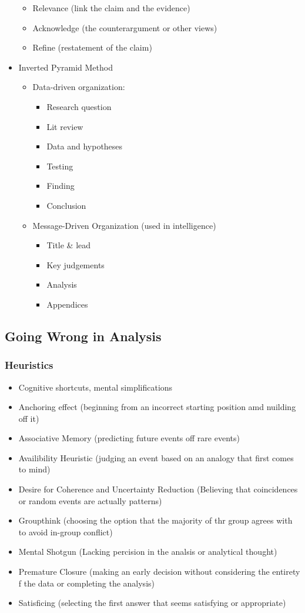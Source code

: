 \documentclass[11pt]{article}
\begin{document}
\begin{itemize}
\begin{itemize}
\item Relevance (link the claim and the evidence)
\item Acknowledge (the counterargument or other views)
\item Refine (restatement of the claim)
\end{itemize}
\item Inverted Pyramid Method
\begin{itemize}
\item Data-driven organization:
\begin{itemize}
\item Research question
\item Lit review
\item Data and hypotheses
\item Testing
\item Finding
\item Conclusion
\end{itemize}
\item Message-Driven Organization (used in intelligence)
\begin{itemize}
\item Title \& lead
\item Key judgements
\item Analysis
\item Appendices
\end{itemize}
\end{itemize}
\end{itemize}
\subsection{Going Wrong in Analysis}
\label{sec:orga4acf05}
\subsubsection{Heuristics}
\label{sec:orgd404bb1}
\begin{itemize}
\item Cognitive shortcuts, mental simplifications
\item Anchoring effect (beginning from an incorrect starting position amd nuilding off it)
\item Associative Memory (predicting future events off rare events)
\item Availibility Heuristic (judging an event based on an analogy that first comes to mind)
\item Desire for Coherence and Uncertainty Reduction (Believing that coincidences or random events are actually patterns)
\item Groupthink (choosing the option that the majority of thr group agrees with to avoid in-group conflict)
\item Mental Shotgun (Lacking percision in the analsis or analytical thought)
\item Premature Closure (making an early decision without considering the entirety f the data or completing the analysis)
\item Satisficing (selecting the first answer that seems satisfying or appropriate)
\end{itemize}
\end{document}
